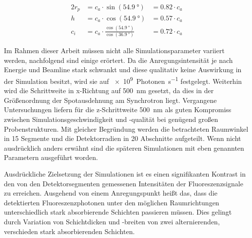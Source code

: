 \begin{alignat}{2}	
r_{p} &= c_a \cdot \sin(\SI{54.9}{\degree}) &= 0.82 \cdot c_a \label{eq:rp}	\\[10pt]
h &= c_a \cdot \cos(\SI{54.9}{\degree}) &= 0.57 \cdot c_a \label{eq:h} \\[7pt]		
c_i &= c_a \cdot \frac{\cos(\SI{54.9}{\degree})}{\cos(\SI{36.9}{\degree})} &= 0.72 \cdot c_a \label{eq:ci}
\end{alignat}

Im Rahmen dieser Arbeit müssen nicht alle Simulationsparameter variiert werden, nachfolgend sind einige erörtert. Da die Anregungsintensität je nach Energie und Beamline stark schwankt und diese qualitativ keine Auswirkung in der Simulation besitzt, wird sie auf \SI{e9}{Photonen\per\second} festgelegt. Weiterhin wird die Schrittweite in x-Richtung auf \SI{500}{\nano\meter} gesetzt, da dies in der Größenordnung der Spotausdehnung am Synchrotron liegt. Vergangene Untersuchungen liefern für die z-Schrittweite \SI{500}{\nano\meter} als guten Kompromiss zwischen Simulationsgeschwindigkeit und -qualität bei genügend großen Probenstrukturen. Mit gleicher Begründung werden die betrachteten Raumwinkel in 15 Segmente und die Detektorradien in 20 Abschnitte aufgeteilt. Wenn nicht ausdrücklich anders erwähnt sind die späteren Simulationen mit eben genannten Parametern ausgeführt worden.\newline

Ausdrückliche Zielsetzung der Simulationen ist es einen signifikanten Kontrast in den von den Detektorsegmenten gemessenen Intensitäten der Fluoreszenzsignale zu erreichen. Ausgehend von einem Anregungspunkt heißt das, dass die detektierten Fluoreszenzphotonen unter den möglichen Raumrichtungen unterschiedlich stark absorbierende Schichten passieren müssen. Dies gelingt durch Variation von Schichtdicken und -breiten von zwei alternierenden, verschieden stark absorbierenden Schichten.